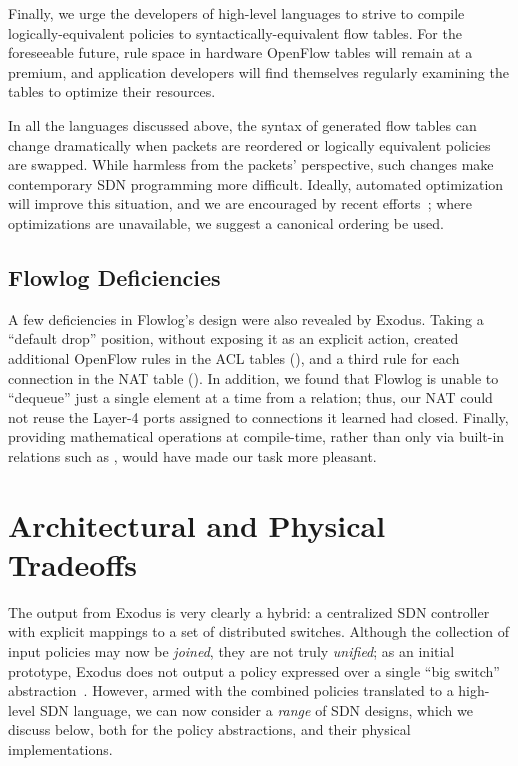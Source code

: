 Finally, we urge the developers of high-level languages to strive to compile
logically-equivalent policies to syntactically-equivalent flow tables.
For the foreseeable future, rule space in hardware OpenFlow tables
will remain at a premium, and application developers will find themselves
regularly examining the tables to optimize their resources.

In all the languages discussed above, the syntax of generated flow tables
can change dramatically when packets are reordered or logically equivalent
policies are swapped. While harmless from the packets' perspective, such changes
make contemporary SDN programming more difficult.
Ideally, automated optimization will improve this situation, and we are encouraged
by recent efforts~\cite{Kang:2013optimizing,Kanizo:2013palette}; where optimizations
are unavailable, we suggest a canonical ordering be used.



\subsection{Flowlog Deficiencies} 

A few deficiencies in Flowlog's design were also revealed by Exodus.
Taking a ``default drop'' position, without exposing it as an explicit action, created additional
OpenFlow rules in the ACL tables (), and a third rule for each
connection in the NAT table ().
In addition, we found that Flowlog is unable to ``dequeue'' just a single element at a
time from a relation; thus, our NAT could not reuse the Layer-4 ports assigned to
connections it learned had closed.
Finally, providing mathematical operations at compile-time, rather than only
via built-in relations such as , would have made our task more pleasant.

\section{Architectural and Physical Tradeoffs}
\label{sec:physical-tradeoffs}

The output from Exodus is very clearly a hybrid: a centralized SDN controller with explicit
mappings to a set of distributed switches. Although the collection of input policies may
now be \emph{joined}, they are not truly \emph{unified}; as an initial prototype, Exodus
does not output a policy expressed over a single ``big switch'' abstraction~\cite{Casado:2010virtualizing,monsanto++:nsdi13-pyretic,Shenker:2011talk}.
However, armed with the combined policies translated to a high-level SDN language,
we can now consider a \emph{range} of SDN designs, which we discuss below,
both for the policy abstractions, and their physical implementations.


